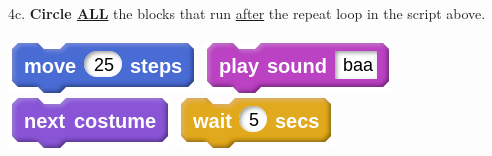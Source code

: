 \documentclass[letterpaper,12pt]{article}
\begin{document}
\noindent 4c. \textbf{Circle \underline{ALL}} the blocks that run \underline{after} the repeat loop in the script above. \\ \\
\includegraphics[scale=.4]{q4_script1.png} \hspace{1cm}
\includegraphics[scale=.4]{q4_script2.png} \hspace{1cm}
\includegraphics[scale=.4]{q4_script3.png} \hspace{1cm}
\includegraphics[scale=.4]{q4_script4.png} \hspace{1cm}\\

\noindent \dotfill \\
\end{document}
